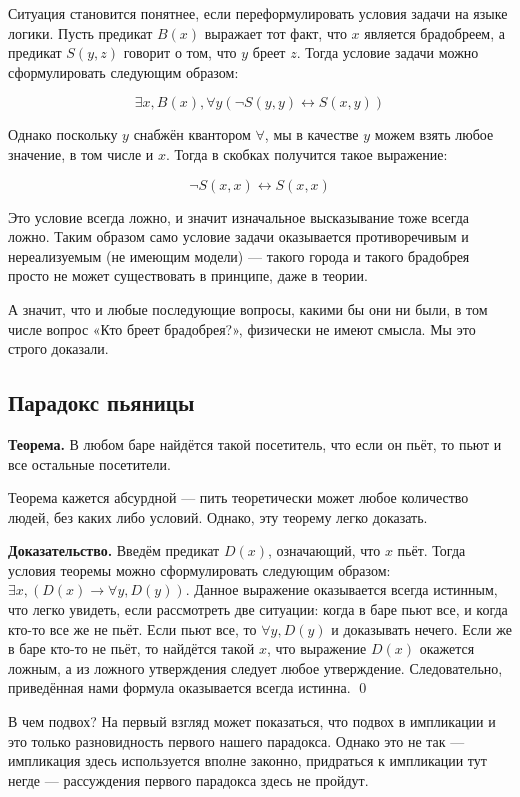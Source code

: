 Ситуация становится понятнее, если переформулировать условия задачи на языке логики. Пусть предикат $B(x)$ выражает тот факт, что $x$ является брадобреем, а предикат $S(y, z)$ говорит о том, что $y$ бреет $z$. Тогда условие задачи можно сформулировать следующим образом:

$$\exists x, B(x), \forall y (\neg S(y, y) \leftrightarrow S(x, y))$$

Однако поскольку $y$ снабжён квантором $\forall$, мы в качестве $y$ можем взять любое значение, в том числе и $x$. Тогда в скобках получится такое выражение:

$$\neg S(x, x) \leftrightarrow S(x, x)$$

Это условие всегда ложно, и значит изначальное высказывание тоже всегда ложно. Таким образом само условие задачи оказывается противоречивым и нереализуемым (не имеющим модели) — такого города и такого брадобрея просто не может существовать в принципе, даже в теории.

А значит, что и любые последующие вопросы, какими бы они ни были, в том числе вопрос «Кто бреет брадобрея?», физически не имеют смысла. Мы это строго доказали.

\subsection{Парадокс пьяницы}

{\bfseries Теорема.} В любом баре найдётся такой посетитель, что если он пьёт, то пьют и все остальные посетители.

Теорема кажется абсурдной — пить теоретически может любое количество людей, без каких либо условий. Однако, эту теорему легко доказать.

{\bfseries Доказательство.} Введём предикат $D(x)$, означающий, что $x$ пьёт. Тогда условия теоремы можно сформулировать следующим образом: $\exists x, (D(x) \rightarrow \forall y, D(y))$. Данное выражение оказывается всегда истинным, что легко увидеть, если рассмотреть две ситуации: когда в баре пьют все, и когда кто-то все же не пьёт. Если пьют все, то $\forall y, D(y)$ и доказывать нечего. Если же в баре кто-то не пьёт, то найдётся такой $x$, что выражение $D(x)$ окажется ложным, а из ложного утверждения следует любое утверждение. Следовательно, приведённая нами формула оказывается всегда истинна. \qed

В чем подвох? На первый взгляд может показаться, что подвох в импликации и это только разновидность первого нашего парадокса. Однако это не так — импликация здесь используется вполне законно, придраться к импликации тут негде — рассуждения первого парадокса здесь не пройдут.

